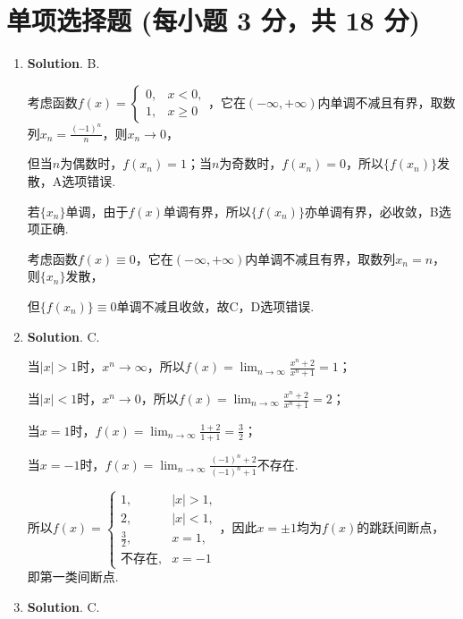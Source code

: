 \documentclass[../Main.tex]{subfiles}
\begin{document}
\section{单项选择题 (每小题 3 分，共 18 分)}
\begin{enumerate}
    \item \textbf{Solution}. B.

          考虑函数$f(x)=
              \begin{cases}
                  0, & x<0,   \\
                  1, & x\geq0
              \end{cases}$，它在$(-\infty,+\infty)$内单调不减且有界，取数列$x_{n}=\frac{(-1)^{n}}{n}$，则$x
                  _{n}\to0$，

          但当$n$为偶数时，$f(x_{n})=1$；当$n$为奇数时，$f(x_{n})=0$，所以$\{f(x_{n})
              \}$发散，A选项错误.

          若$\{x_{n}\}$单调，由于$f(x)$单调有界，所以$\{f(x_{n})\}$亦单调有界，必收敛，B选项正确.

          考虑函数$f(x)\equiv0$，它在$(-\infty,+\infty)$内单调不减且有界，取数列$x_{n}
              =n$，则$\{x_{n}\}$发散，

          但$\{f(x_{n})\}\equiv0$单调不减且收敛，故C，D选项错误.

    \item \textbf{Solution}. C.

          当$|x|>1$时，$x^{n}\to\infty$，所以$f(x)=\lim_{n\to\infty}\frac{x^{n}+2}{x^{n}+1}
              =1$；

          当$|x|<1$时，$x^{n}\to0$，所以$f(x)=\lim_{n\to\infty}\frac{x^{n}+2}{x^{n}+1}
              =2$；

          当$x=1$时，$f(x)=\lim_{n\to\infty}\frac{1+2}{1+1}=\frac{3}{2}$；

          当$x=-1$时，$f(x)=\lim_{n\to\infty}\frac{(-1)^{n}+2}{(-1)^{n}+1}$不存在.

          所以$f(x)=
              \begin{cases}
                  1,           & |x|>1, \\
                  2,           & |x|<1, \\
                  \frac{3}{2}, & x=1,   \\
                  \text{不存在},  & x=-1
              \end{cases}$，因此$x=\pm1$均为$f(x)$的跳跃间断点，即第一类间断点.

    \item \textbf{Solution}. C.


\end{enumerate}
\end{document}
